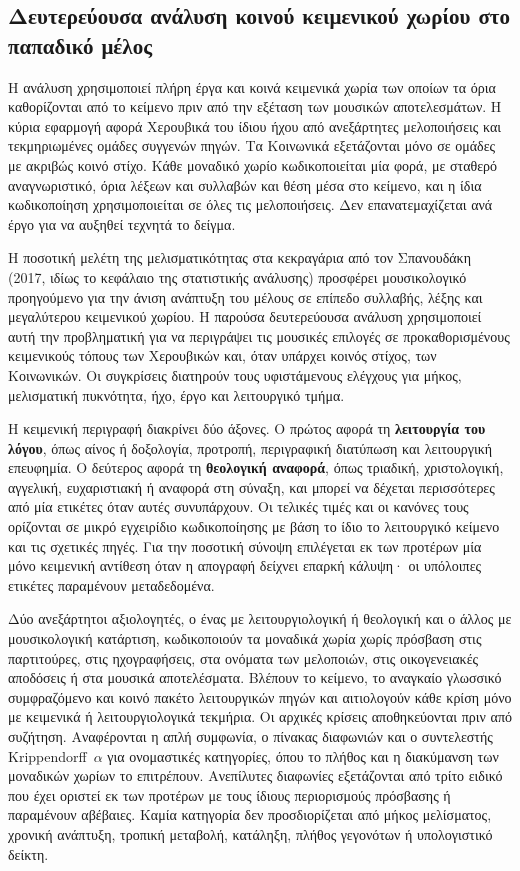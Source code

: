 \documentclass[11pt,a4paper]{article}
\begin{document}
\subsection{Δευτερεύουσα ανάλυση κοινού κειμενικού χωρίου στο παπαδικό μέλος}\label{sec:text-locus}

Η ανάλυση χρησιμοποιεί πλήρη έργα και κοινά κειμενικά χωρία των οποίων τα όρια καθορίζονται από το κείμενο πριν από την εξέταση των μουσικών αποτελεσμάτων. Η κύρια εφαρμογή αφορά Χερουβικά του ίδιου ήχου από ανεξάρτητες μελοποιήσεις και τεκμηριωμένες ομάδες συγγενών πηγών. Τα Κοινωνικά εξετάζονται μόνο σε ομάδες με ακριβώς κοινό στίχο. Κάθε μοναδικό χωρίο κωδικοποιείται μία φορά, με σταθερό αναγνωριστικό, όρια λέξεων και συλλαβών και θέση μέσα στο κείμενο, και η ίδια κωδικοποίηση χρησιμοποιείται σε όλες τις μελοποιήσεις. Δεν επανατεμαχίζεται ανά έργο για να αυξηθεί τεχνητά το δείγμα.

Η ποσοτική μελέτη της μελισματικότητας στα κεκραγάρια από τον Σπανουδάκη (2017, ιδίως το κεφάλαιο της στατιστικής ανάλυσης) προσφέρει μουσικολογικό προηγούμενο για την άνιση ανάπτυξη του μέλους σε επίπεδο συλλαβής, λέξης και μεγαλύτερου κειμενικού χωρίου. Η παρούσα δευτερεύουσα ανάλυση χρησιμοποιεί αυτή την προβληματική για να περιγράψει τις μουσικές επιλογές σε προκαθορισμένους κειμενικούς τόπους των Χερουβικών και, όταν υπάρχει κοινός στίχος, των Κοινωνικών. Οι συγκρίσεις διατηρούν τους υφιστάμενους ελέγχους για μήκος, μελισματική πυκνότητα, ήχο, έργο και λειτουργικό τμήμα.

Η κειμενική περιγραφή διακρίνει δύο άξονες. Ο πρώτος αφορά τη \textbf{λειτουργία του λόγου}, όπως αίνος ή δοξολογία, προτροπή, περιγραφική διατύπωση και λειτουργική επευφημία. Ο δεύτερος αφορά τη \textbf{θεολογική αναφορά}, όπως τριαδική, χριστολογική, αγγελική, ευχαριστιακή ή αναφορά στη σύναξη, και μπορεί να δέχεται περισσότερες από μία ετικέτες όταν αυτές συνυπάρχουν. Οι τελικές τιμές και οι κανόνες τους ορίζονται σε μικρό εγχειρίδιο κωδικοποίησης με βάση το ίδιο το λειτουργικό κείμενο και τις σχετικές πηγές. Για την ποσοτική σύνοψη επιλέγεται εκ των προτέρων μία μόνο κειμενική αντίθεση όταν η απογραφή δείχνει επαρκή κάλυψη· οι υπόλοιπες ετικέτες παραμένουν μεταδεδομένα.

Δύο ανεξάρτητοι αξιολογητές, ο ένας με λειτουργιολογική ή θεολογική και ο άλλος με μουσικολογική κατάρτιση, κωδικοποιούν τα μοναδικά χωρία χωρίς πρόσβαση στις παρτιτούρες, στις ηχογραφήσεις, στα ονόματα των μελοποιών, στις οικογενειακές αποδόσεις ή στα μουσικά αποτελέσματα. Βλέπουν το κείμενο, το αναγκαίο γλωσσικό συμφραζόμενο και κοινό πακέτο λειτουργικών πηγών και αιτιολογούν κάθε κρίση μόνο με κειμενικά ή λειτουργιολογικά τεκμήρια. Οι αρχικές κρίσεις αποθηκεύονται πριν από συζήτηση. Αναφέρονται η απλή συμφωνία, ο πίνακας διαφωνιών και ο συντελεστής Krippendorff~$\alpha$ για ονομαστικές κατηγορίες, όπου το πλήθος και η διακύμανση των μοναδικών χωρίων το επιτρέπουν. Ανεπίλυτες διαφωνίες εξετάζονται από τρίτο ειδικό που έχει οριστεί εκ των προτέρων με τους ίδιους περιορισμούς πρόσβασης ή παραμένουν αβέβαιες. Καμία κατηγορία δεν προσδιορίζεται από μήκος μελίσματος, χρονική ανάπτυξη, τροπική μεταβολή, κατάληξη, πλήθος γεγονότων ή υπολογιστικό δείκτη.
\end{document}

